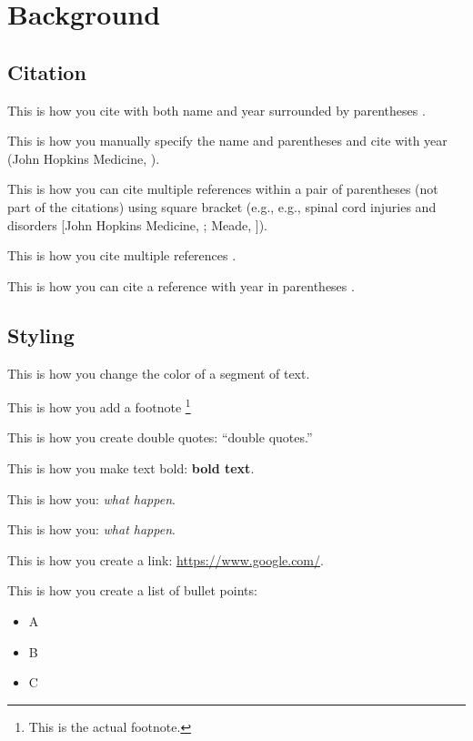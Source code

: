 \section{Background}

\subsection{Citation}
This is how you cite with both name and year surrounded by parentheses \parencite{anderson_chronic_2010}. 

This is how you manually specify the name and parentheses and cite with year (John Hopkins Medicine, \citeyear{john_hopkins_medicine_acute_2021}).

This is how you can cite multiple references within a pair of parentheses (not part of the citations) using square bracket (e.g., e.g., spinal cord injuries and disorders [John Hopkins Medicine, \citeyear{john_hopkins_medicine_acute_2021}; Meade, \citeyear{meade_health_2009}]).

This is how you cite multiple references \parencite{meade_health_2009, mamykina_mahi_2008,rooksby_personal_2014, murnane_personal_2018, raj_understanding_2017}.

This is how you can cite a reference with year in parentheses \textcite{anderson_patient_1995}.

\subsection{Styling}

\textcolor{\changecolor}{This is how you change the color of a segment of text.}

This is how you add a footnote \footnote{This is the actual footnote.}

This is how you create double quotes: ``double quotes.''

This is how you make text bold: \textbf{bold text}.


This is how you: \emph{what happen}.

This is how you: \textit{what happen}.

This is how you create a link: \url{https://www.google.com/}.

This is how you create a list of bullet points:

\begin{itemize}
    \item A
    \item B
    \item C
\end{itemize}

